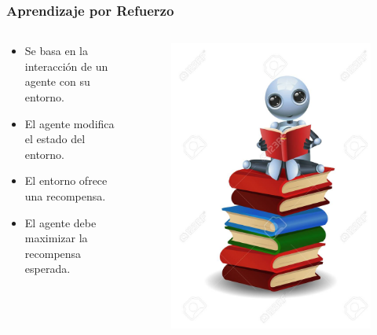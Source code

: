 \documentclass[10pt]{beamer}
\begin{document}
\begin{frame}
    \frametitle{Aprendizaje por Refuerzo}
    \begin{columns}
        \begin{column}{0.5\textwidth}
          \begin{itemize}
              \item Se basa en la interacción de un agente con su entorno.
              \item El agente modifica el estado del entorno.
              \item El entorno ofrece una recompensa.
              \item El agente debe maximizar la recompensa esperada.
          \end{itemize}
        \end{column}
        \begin{column}{0.5\textwidth}
          \begin{figure}[!h] 
            \centering
            \includegraphics[width=1\textwidth]{img/robot2}
          \end{figure}  
        \end{column}
      \end{columns}

\end{frame}
\end{document}
